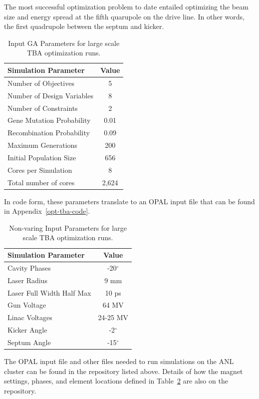 \label{setup}
The most successful optimization problem to date entailed optimizing the 
beam size and energy spread at the fifth quarupole on the drive line.
In other words, the first quadrupole between the septum and kicker.
\begin{table}%
	\begin{center}
		\caption{Input GA Parameters for large scale TBA optimization runs.}
		\label{tab:opt-tba}
		\begin{tabular}{lc}
			\toprule
			\toprule
			\textbf{Simulation Parameter} 	&  \textbf{Value} \\ 
			\midrule
			{Number of Objectives}			&  5 \\
			Number of Design Variables		&  8 \\
			Number of Constraints			&  2 \\
			{Gene Mutation Probability} 	&  0.01\\ 
			{Recombination Probability} 	&  0.09 \\
			{Maximum  Generations}			&  200 \\
			{Initial  Population Size}		&  656\\ 
			Cores per Simulation 			&  8 \\
			Total number of cores			& 2,624  \\
			\bottomrule
		\end{tabular}
	\end{center}
\end{table}
In code form, these parameters translate to an OPAL input file that 
can be found in Appendix~\ref{opt-tba-code}.
\begin{table}%
	\begin{center}
		\caption{Non-varing Input Parameters for large scale TBA optimization runs.}
		\label{tab:variables}
		\begin{tabular}{lc}
			\toprule
			\toprule
			\textbf{Simulation Parameter} 	&  \textbf{Value} \\ 
			\midrule
			Cavity Phases		&  -20$^\circ$ \\
			Laser Radius		& 9 mm \\
			Laser Full Width Half Max	& 10 ps \\
			Gun Voltage 				& 64 MV\\ 
			Linac Voltages 				& 24-25 MV \\
			Kicker Angle				& -2$^\circ$ \\
			Septum Angle				& -15$^\circ$\\ 
			\bottomrule
		\end{tabular}
	\end{center}
\end{table}
The OPAL input file and other files needed to run simulations on the ANL cluster 
can be found in the repository listed above.
Details of how the magnet settings, phases, and element locations defined 
in Table~\ref{tab:variables} are also on the repository.


